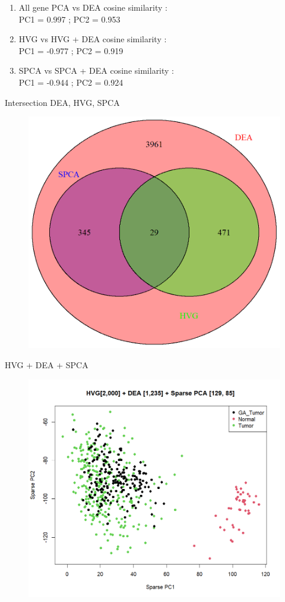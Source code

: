 \documentclass[12pt, aspectratio=43]{beamer}
\begin{document}
	
	\begin{frame}
		\begin{enumerate}
			\item All gene PCA vs DEA cosine similarity : 
			\\
			PC1 = 0.997 ; PC2 = 0.953
			\item  HVG vs HVG + DEA cosine similarity : 
			\\
			PC1 = -0.977 ; PC2 = 0.919
			\item  SPCA vs SPCA + DEA cosine similarity : 
			\\
			PC1 = -0.944 ; PC2 = 0.924
		\end{enumerate}
	\end{frame}
	
	
	
	\begin{frame}{Intersection DEA, HVG, SPCA}
		\begin{figure}[h!]
			\centering
			\includegraphics[width=0.8\linewidth]{Venn.png}
		\end{figure}
	\end{frame}
	
	\begin{frame}{HVG + DEA + SPCA}
		\begin{figure}[h!]
			\centering
			\includegraphics[width=0.8\linewidth]{hvg_dea_spca.png}
		\end{figure}
	\end{frame}
	
\end{document}
